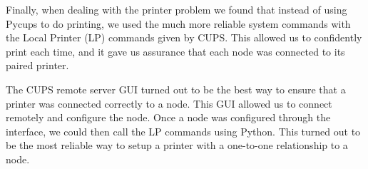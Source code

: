 \documentclass[draftclsnofoot, onecolumn, compsoc, 10pt]{IEEEtran}
\begin{document}
Finally, when dealing with the printer problem
we found that instead of using Pycups to do printing, we used the much more reliable system commands with the Local Printer (LP) commands given by CUPS. This allowed us to confidently print each time, and it gave us assurance that each node was connected to its paired printer. 

The CUPS remote server GUI turned out to be the best way to ensure that a printer was connected correctly to a node.
This GUI allowed us to connect remotely and configure the node. Once a node was configured through the interface, we could then call the LP commands using Python. This turned out to be the most reliable way to setup a printer with a one-to-one relationship to a node.



\end{document}
